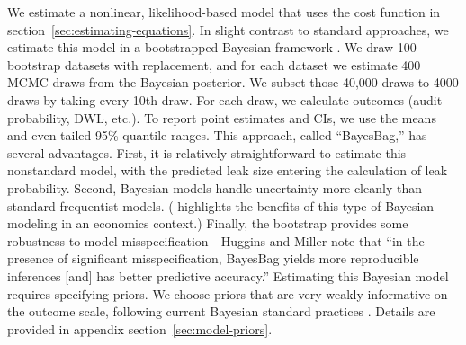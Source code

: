 \documentclass[12pt,oneside,letterpaper]{article}
\theoremstyle{definition}
\begin{document}
\begin{refsection}
We estimate a nonlinear, likelihood-based model that uses the cost function in section~\ref{sec:estimating-equations}.
In slight contrast to standard approaches, we estimate this model in a bootstrapped Bayesian framework \parencite{Huggins/Miller:2019}.
We draw 100 bootstrap datasets with replacement, and for each dataset we estimate 400 \gls{MCMC} draws from the Bayesian posterior.
We subset those 40,000 draws to 4000 draws by taking every 10th draw.
For each draw, we calculate outcomes (audit probability, \gls{DWL}, etc.).
To report point estimates and \glspl{CI}, we use the means and even-tailed 95\% quantile ranges.
This approach, called ``BayesBag,'' has several advantages.
First, it is relatively straightforward to estimate this nonstandard model, with the predicted leak size entering the calculation of leak probability.
Second, Bayesian models handle uncertainty more cleanly than standard frequentist models.
(\cite{Meager:2019} highlights the benefits of this type of Bayesian modeling in an economics context.)
Finally, the bootstrap provides some robustness to model misspecification---Huggins and Miller note that ``in the presence of significant misspecification, BayesBag yields more reproducible inferences [and] has better predictive accuracy.''
Estimating this Bayesian model requires specifying priors.
We choose priors that are very weakly informative on the outcome scale,
following current Bayesian standard practices \parencite{Gelman/etal:2020}.
Details are provided in appendix section~\ref{sec:model-priors}.


\end{refsection}
\end{document}
